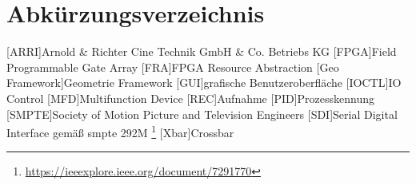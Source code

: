 
\chapter{Abk\"urzungsverzeichnis}


\begin{acronym}
	[ARRI]{Arnold \& Richter Cine Technik GmbH \& Co. Betriebs KG}
	[FPGA]{Field Programmable Gate Array}
	[FRA]{FPGA Resource Abstraction}
	[Geo Framework]{Geometrie Framework}
	[GUI]{grafische Benutzeroberfläche}
	[IOCTL]{IO Control}
	[MFD]{Multifunction Device}
	[REC]{Aufnahme}
	[PID]{Prozesskennung}
	[SMPTE]{Society of Motion Picture and Television Engineers}
	[SDI]{Serial Digital Interface} gemäß \ac{smpte} 292M \footnote{\url{https://ieeexplore.ieee.org/document/7291770}}
	[Xbar]{Crossbar}
\end{acronym}

